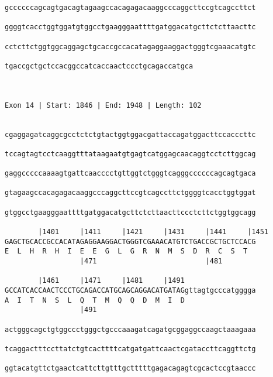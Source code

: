 \documentclass{article}
\begin{document}
\begin{Verbatim}
gccccccagcagtgacagtagaagccacagagacaaggcccaggcttccgtcagccttct
                                                            
ggggtcacctggtggatgtggcctgaagggaattttgatggacatgcttctcttaacttc
                                                            
cctcttctggtggcaggagctgcaccgccacatagaggaaggactgggtcgaaacatgtc
                                                            
tgaccgctgctccacggccatcaccaactccctgcagaccatgca
                                             
                                             
 
Exon 14 | Start: 1846 | End: 1948 | Length: 102


cgaggagatcaggcgcctctctgtactggtggacgattaccagatggacttccacccttc
                                                            
tccagtagtcctcaaggtttataagaatgtgagtcatggagcaacaggtcctcttggcag
                                                            
gaggcccccaaaagtgattcaacccctgttggtctgggtcagggccccccagcagtgaca
                                                            
gtagaagccacagagacaaggcccaggcttccgtcagccttctggggtcacctggtggat
                                                            
gtggcctgaagggaattttgatggacatgcttctcttaacttccctcttctggtggcagg
                                                            
        |1401     |1411     |1421     |1431     |1441     |1451
GAGCTGCACCGCCACATAGAGGAAGGACTGGGTCGAAACATGTCTGACCGCTGCTCCACG
E  L  H  R  H  I  E  E  G  L  G  R  N  M  S  D  R  C  S  T  
                  |471                          |481        
  
        |1461     |1471     |1481     |1491                 
GCCATCACCAACTCCCTGCAGACCATGCAGCAGGACATGATAGgttagtgcccatgggga
A  I  T  N  S  L  Q  T  M  Q  Q  D  M  I  D                 
                  |491                                      
  
actgggcagctgtggccctgggctgcccaaagatcagatgcggaggccaagctaaagaaa
                                                            
tcaggactttccttatctgtcacttttcatgatgattcaactcgataccttcaggttctg
                                                            
ggtacatgttctgaactcattcttgtttgctttttgagacagagtcgcactccgtaaccc
                                                            

\end{Verbatim}
\end{document}
